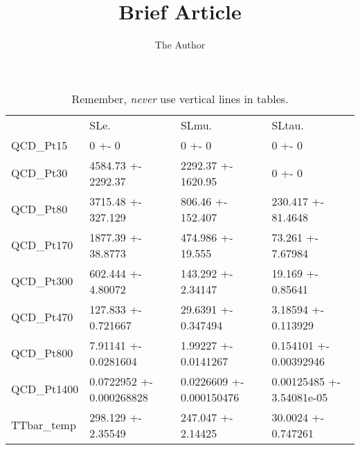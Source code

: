 \documentclass[11pt]{amsart}
\title{Brief Article}
\author{The Author}
\begin{document}
\maketitle

\begin{landscape}
\begin{table}[hbtp]
   \centering
   \caption{Remember, \emph{never} use vertical lines in tables.}
   \begin{tabular}{llll } %
\small  & \small  SLe. & \small  SLmu. & \small  SLtau.\\
\small QCD_Pt15 & \small   0 +- 0 & \small   0 +- 0 & \small   0 +- 0\\
\small QCD_Pt30 & \small   4584.73 +- 2292.37 & \small   2292.37 +- 1620.95 & \small   0 +- 0\\
\small QCD_Pt80 & \small   3715.48 +- 327.129 & \small 806.46 +- 152.407 & \small   230.417 +- 81.4648\\
\small QCD_Pt170 & \small   1877.39 +- 38.8773 & \small   474.986 +- 19.555 & \small 73.261 +- 7.67984\\
\small QCD_Pt300 & \small   602.444 +- 4.80072 & \small   143.292 +- 2.34147 & \small 19.169 +- 0.85641\\
\small QCD_Pt470 & \small   127.833 +- 0.721667 & \small   29.6391 +- 0.347494 & \small   3.18594 +- 0.113929\\
\small QCD_Pt800 & \small   7.91141 +- 0.0281604 & \small   1.99227 +- 0.0141267 & \small  0.154101 +- 0.00392946\\
\small QCD_Pt1400 & \small 0.0722952 +- 0.000268828 & \small 0.0226609 +- 0.000150476 & \small   0.00125485 +- 3.54081e-05\\
\small TTbar_temp & \small   298.129 +- 2.35549 & \small   247.047 +- 2.14425 & \small   30.0024 +- 0.747261\\

\end{tabular}
\end{table}
\end{landscape}
\end{document}
